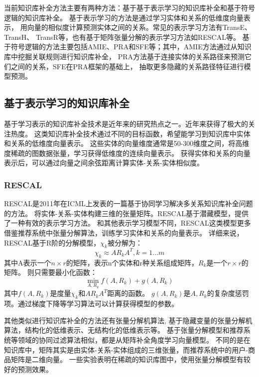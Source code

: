 当前知识库补全方法主要有两种方法：基于基于表示学习的知识库补全和基于符号逻辑的知识库补全。
基于表示学习的方法是通过学习实体和关系的低维度向量表示，
用向量的相似度计算预测实体之间的关系。常见的表示学习方法有TransE\cite{NIPS2013_5071}、TransH\cite{Wang2014KnowledgeGE}、
TransR\cite{Huang2017ImprovedKB}等，也有基于矩阵张量分解的表示学习方法如RESCAL\cite{Nickel2011}等。
基于符号逻辑的方法主要包括AMIE\cite{Galrraga2013AMIEAR}、PRA\cite{Lao2010}和SFE\cite{Gardner2015}等；其中，AMIE方法通过从知识库中挖掘关联规则进行知识库补全，
PRA方法基于连接实体的关系路径来预测它们之间的关系，SFE在PRA框架的基础上，
抽取更多隐藏的关系路径特征进行模型预测。

\subsection{基于表示学习的知识库补全}
\label{cha:presentation}
基于学习表示的知识库补全技术是近年来的研究热点之一。近年来获得了极大的关注热度。
这类知识库补全技术通过不同的目标函数，希望能学习到知识库中实体和关系的低维度向量表示。
这些实体的向量维度通常是50-300维度之间，将高维度稀疏的图数据张量，学习获得低维度的连续向量表示。
获得实体和关系的向量表示后，可以通过向量之间余弦距离计算实体-关系-实体相似度。

\subsubsection{RESCAL}
RESCAL是2011年在ICML上发表的一篇基于协同学习解决多关系知识库补全问题的方法。
将实体-关系-实体构建三维的张量矩阵。RESCAL基于潜藏模型，提供了一种有效的表示学习方法。
和其他表示学习模型不同，RESCAL这类模型更多借鉴推荐系统中张量分解算法，训练学习实体和关系的向量表示。
详细来说，RESCAL基于R阶的分解模型，$\chi_k$被分解为：
$$\chi_k \approx AR_{k}A^T, k =1...m$$
其中A表示一个$n\times r$的矩阵，表示n个实体和r种关系组成矩阵，$R_{k}$是一个$r\times r$的矩阵。
则只需要最小化函数：
$$\min \limits_{A,R_k} f(A,R_k)+g(A,R_k)$$
其中$f(A,R_k)$是度量$\chi_k$和$AR_{k}A^T$距离的函数。
$g(A,R_k)$是$A,R_k$的复杂度惩罚项。通过梯度下降等学习算法可以计算获得模型的参数。

其他类似进行知识库补全的方法还有张量分解机算法\cite{Rendle2010FactorizationM},
基于隐藏变量的张量分解机算法\cite{Rendle2012FactorizationMW}，结构化的低维表示\cite{2009EmbeddingLS}、无结构化的低维表示等。
基于张量分解模型和推荐系统等领域的协同过滤算法相似，都是从矩阵补全角度学习向量模型。
不同的是在知识库中，矩阵其实是由实体-关系-实体组成的三维张量，而推荐系统中的用户-商品矩阵是二维向量。
一些实验\cite{Dong2014}表明在稀疏的知识库图中，使用张量分解模型有较好的预测效果。


